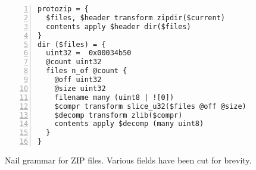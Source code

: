 \begin{figure}
\smaller[1.0]
\begin{Verbatim}[numbers=left, xleftmargin=3em]
protozip = { 
  $files, $header transform zipdir($current)
  contents apply $header dir($files)
}
dir ($files) = {
  uint32 =  0x00034b50
  @count uint32
  files n_of @count {
    @off uint32
    @size uint32
    filename many (uint8 | ![0])
    $compr transform slice_u32($files @off @size)
    $decomp transform zlib($compr)
    contents apply $decomp (many uint8)
  }
}
\end{Verbatim}
\caption{Nail grammar for ZIP files. Various fields have been cut for brevity.}
\label{fig:zip-extract}
\end{figure}
